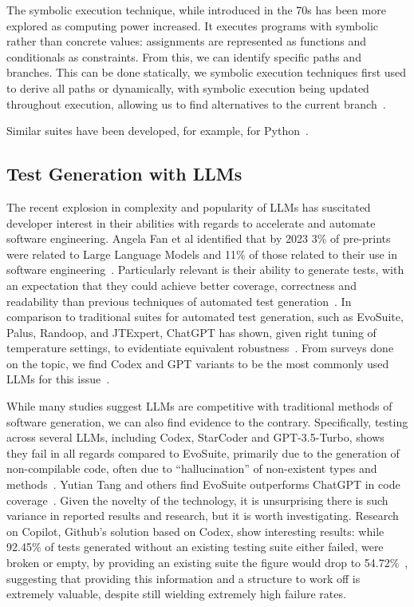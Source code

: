 The symbolic execution technique, while introduced in the 70s has been more explored as computing power increased. It executes programs with symbolic rather than concrete values: assignments are represented as functions and conditionals as constraints. From this, we can identify specific paths and branches. This can be done statically, we symbolic execution techniques first used to derive all paths or dynamically, with symbolic execution being updated throughout execution, allowing us to find alternatives to the current branch~\cite{kn:symbolicexec}.


Similar suites have been developed, for example, for Python~\cite{kn:pynguin}.

\subsection{Test Generation with LLMs}

The recent explosion in complexity and popularity of LLMs has suscitated developer interest in their abilities with regards to accelerate and automate software engineering. Angela Fan et al identified that by 2023 3\% of pre-prints were related to Large Language Models and 11\% of those related to their use in software engineering~\cite{kn:angela}. Particularly relevant is their ability to generate tests, with an expectation that they could achieve better coverage, correctness and readability than previous techniques of automated test generation~\cite{kn:junjiewang}.
In comparison to traditional suites for automated test generation, such as EvoSuite, Palus, Randoop, and JTExpert, ChatGPT has shown, given right tuning of temperature settings, to evidentiate equivalent robustness~\cite{kn:gptunitbra}.
From surveys done on the topic, we find Codex and GPT variants to be the most commonly used LLMs for this issue~\cite{kn:junjiewang}.

While many studies suggest LLMs are competitive with traditional methods of software generation, we can also find evidence to the contrary. Specifically, testing across several LLMs, including Codex, StarCoder and GPT-3.5-Turbo, shows they fail in all regards compared to EvoSuite, primarily due to the generation of non-compilable code, often due to ``hallucination'' of non-existent types and methods~\cite{kn:siddiq2023empirical}. Yutian Tang and others find EvoSuite outperforms ChatGPT in code coverage~\cite{kn:tang2023chatgpt}. Given the novelty of the technology, it is unsurprising there is such variance in reported results and research, but it is worth investigating. Research on Copilot, Github's solution based on Codex, show interesting results: while 92.45\% of tests generated without an existing testing suite either failed, were broken or empty, by providing an existing suite the figure would drop to 54.72\%~\cite{kn:githubcopilot}, suggesting that providing this information and a structure to work off is extremely valuable, despite still wielding extremely high failure rates.

